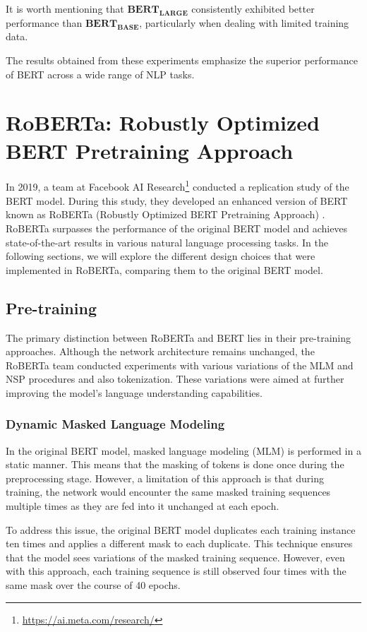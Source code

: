 \documentclass[12pt,oneside,bibtotoc,liststotoc]{scrbook}
\begin{document}
It is worth mentioning that $\mathbf{BERT_{LARGE}}$ consistently exhibited better performance than $\mathbf{BERT_{BASE}}$, particularly when dealing with limited training data.

The results obtained from these experiments emphasize the superior performance of BERT across a wide range of NLP tasks. \cite{bert}

\section{RoBERTa: Robustly Optimized BERT Pretraining Approach}
In 2019, a team at Facebook AI Research\footnote{\url{https://ai.meta.com/research/}} conducted a replication study of the BERT model. During this study, they developed an enhanced version of BERT known as RoBERTa (Robustly Optimized BERT Pretraining Approach) \cite{roberta}. RoBERTa surpasses the performance of the original BERT model and achieves state-of-the-art results in various natural language processing tasks. In the following sections, we will explore the different design choices that were implemented in RoBERTa, comparing them to the original BERT model.

\subsection{Pre-training}
The primary distinction between RoBERTa and BERT lies in their pre-training approaches. Although the network architecture remains unchanged, the RoBERTa team conducted experiments with various variations of the MLM and NSP procedures and also tokenization. These variations were aimed at further improving the model's language understanding capabilities. \cite{roberta}

\subsubsection{Dynamic Masked Language Modeling}
In the original BERT model, masked language modeling (MLM) is performed in a static manner. This means that the masking of tokens is done once during the preprocessing stage. However, a limitation of this approach is that during training, the network would encounter the same masked training sequences multiple times as they are fed into it unchanged at each epoch.

To address this issue, the original BERT model duplicates each training instance ten times and applies a different mask to each duplicate. This technique ensures that the model sees variations of the masked training sequence. However, even with this approach, each training sequence is still observed four times with the same mask over the course of 40 epochs.
\end{document}
